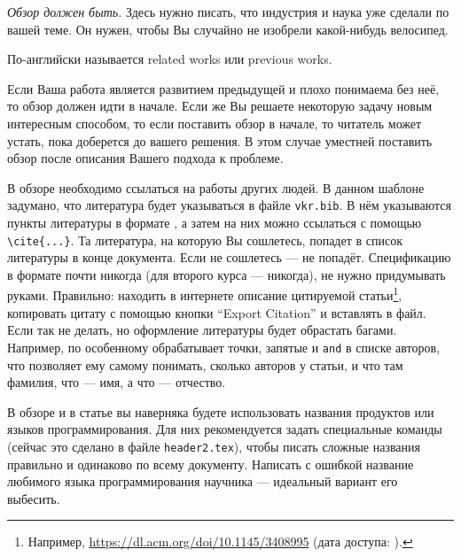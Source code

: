 
\label{sec:relatedworks}
\emph{Обзор должен быть.} Здесь нужно писать, что индустрия и наука уже сделали по вашей теме. Он нужен, чтобы Вы случайно не изобрели какой-нибудь велосипед.

По-английски называется related works или previous works.

Если Ваша работа является развитием предыдущей и плохо понимаема без неё, то обзор должен идти в начале. Если же Вы решаете некоторую задачу новым интересным способом, то если поставить обзор в начале, то читатель может устать, пока доберется до вашего решения. В этом случае уместней поставить обзор после описания Вашего подхода к проблеме.

В обзоре необходимо ссылаться на работы других людей. В данном шаблоне задумано, что литература будет указываться в файле \verb=vkr.bib=. В нём указываются пункты литературы в формате \BibTeX{}, а затем на них можно ссылаться с помощью \verb=\cite{...}=. Та литература, на которую Вы сошлетесь, попадет в список литературы в конце документа. Если не сошлетесь ---  не попадёт. Спецификацию в формате \BibTeX{} почти никогда (для второго курса --- никогда), не нужно придумывать руками. Правильно: находить в интернете описание цитируемой статьи\footnote{Например, \url{https://dl.acm.org/doi/10.1145/3408995} (дата доступа:   ).},
копировать цитату с помощью кнопки ``Export Citation'' и вставлять в \BibTeX{} файл. Если так не делать, но оформление литературы будет обрастать багами. Например, \BibTeX{} по особенному обрабатывает точки, запятые и \verb=and= в списке авторов, что позволяет ему самому понимать, сколько авторов у статьи, и что там фамилия, что --- имя, а что --- отчество.

В обзоре и в статье вы наверняка будете использовать названия продуктов или языков программирования. Для них рекомендуется задать специальные команды (сейчас это сделано в файле \verb=header2.tex=), чтобы писать сложные названия правильно и одинаково по всему документу. Написать с ошибкой  название любимого языка программирования научника --- идеальный вариант его выбесить.

